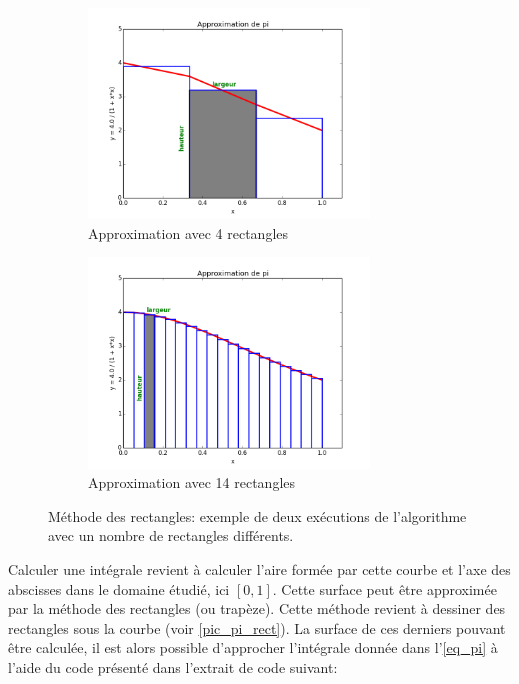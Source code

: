         \begin{figure}[t!]
            \centering
            \begin{subfigure}[t]{0.5\textwidth}
                \centering
                \includegraphics[height=2.2in]{images/Chapitre1/pic_pi_rect_1.png}
                \caption{\label{pic_pi_1} Approximation avec 4 rectangles}
            \end{subfigure}%
        \begin{subfigure}[t]{0.5\textwidth}
                \centering
                \includegraphics[height=2.2in]{images/Chapitre1/pic_pi_rect_2.png}
                \caption{\label{pic_pi_2} Approximation avec 14 rectangles}
            \end{subfigure}
            \caption{\label{pic_pi_rect} Méthode des rectangles: exemple de deux exécutions de l'algorithme avec un nombre de rectangles différents.}
            
        \end{figure}
            
        Calculer une intégrale revient à calculer l'aire formée par cette courbe et l'axe des abscisses dans le domaine étudié, ici $[0,1]$. Cette surface peut être approximée par la méthode des rectangles (ou trapèze). Cette méthode revient à dessiner des rectangles sous la courbe (voir \autoref{pic_pi_rect}). La surface de ces derniers pouvant être calculée, il est alors possible d'approcher l'intégrale donnée dans l'\autoref{eq_pi} à l'aide du code présenté dans l'extrait de code suivant:
        
